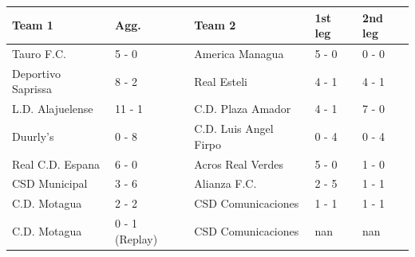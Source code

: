 \documentclass{article}
\begin{document}
\begin{tabular}{lllll}
\toprule
Team 1 & Agg. & Team 2 & 1st leg & 2nd leg \\
\midrule
Tauro F.C. & 5 - 0 & America Managua & 5 - 0 & 0 - 0 \\
Deportivo Saprissa & 8 - 2 & Real Esteli & 4 - 1 & 4 - 1 \\
L.D. Alajuelense & 11 - 1 & C.D. Plaza Amador & 4 - 1 & 7 - 0 \\
Duurly's & 0 - 8 & C.D. Luis Angel Firpo & 0 - 4 & 0 - 4 \\
Real C.D. Espana & 6 - 0 & Acros Real Verdes & 5 - 0 & 1 - 0 \\
CSD Municipal & 3 - 6 & Alianza F.C. & 2 - 5 & 1 - 1 \\
C.D. Motagua & 2 - 2 & CSD Comunicaciones & 1 - 1 & 1 - 1 \\
C.D. Motagua & 0 - 1 (Replay) & CSD Comunicaciones & nan & nan \\
\bottomrule
\end{tabular}
\end{document}
